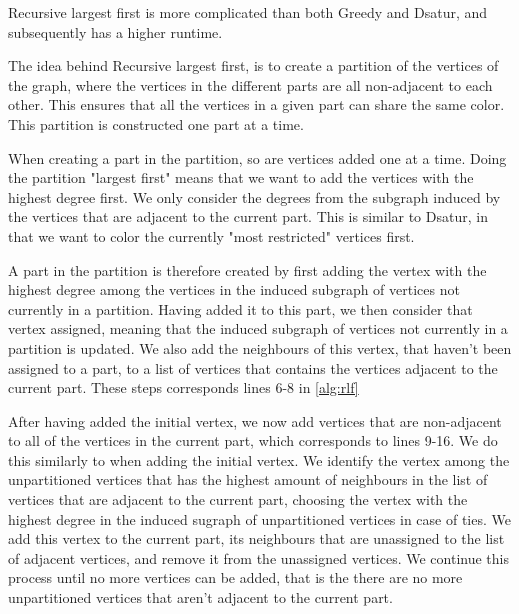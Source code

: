 \documentclass[a4paper]{article}
\begin{document}
Recursive largest first is more complicated than both Greedy and Dsatur, 
and subsequently has a higher runtime.

The idea behind Recursive largest first, is to create a partition of the
vertices of the graph, where the vertices in the different parts are all
non-adjacent to each other. This ensures that all the vertices in a given part
can share the same color.  This partition is constructed one part at a time. 


When creating a part in the partition, so are vertices added one at a time. Doing the
partition "largest first" means that we want to add the vertices with the
highest degree first. We only consider the degrees from the subgraph induced by
the vertices that are adjacent to the current part. This is similar to Dsatur,
in that we want to color the currently "most restricted" vertices first.

A part in the partition is therefore created by first adding the vertex with
the highest degree among the vertices in the induced subgraph of vertices not
currently in a partition. Having added it to this part, we then consider that
vertex assigned, meaning that the induced subgraph of vertices not currently in
a partition is updated.  We also add the neighbours of this vertex, that
haven't been assigned to a part, to a list of vertices that contains the
vertices adjacent to the current part.  
These steps corresponds lines 6-8 in \autoref{alg:rlf}

After having added the initial vertex, we now add vertices that are
non-adjacent to all of the vertices in the current part,
which corresponds to lines 9-16. We do this similarly
to when adding the initial vertex. We identify the vertex among the
unpartitioned vertices that has the highest amount of neighbours in the list of
vertices that are adjacent to the current part, choosing the vertex with the
highest degree in the induced sugraph of unpartitioned vertices in case of
ties.  We add this vertex to the current part, its neighbours that are
unassigned to the list of adjacent vertices, and remove it from the unassigned
vertices. We continue this process until no more vertices can be added, that is the 
there are no more unpartitioned vertices that aren't adjacent to the current part.
\end{document}
